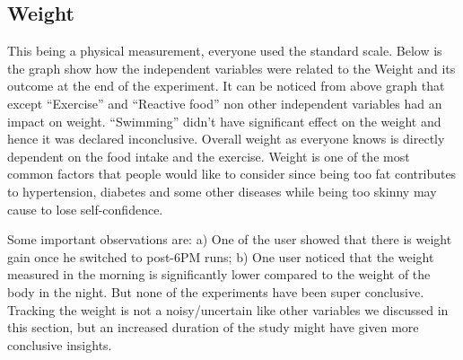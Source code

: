 \subsection{Weight}

This being a physical measurement, everyone used the standard scale. Below is the graph show how the independent variables were related to the Weight and its outcome at the end of the experiment.
It can be noticed from above graph that except “Exercise” and “Reactive food” non other independent variables had an impact on weight. “Swimming” didn’t have significant effect on the weight and hence it was declared inconclusive. Overall weight as everyone knows is directly dependent on the food intake and the exercise. Weight is one of the most common factors that people would like to consider since being too fat contributes to hypertension, diabetes and some other diseases while being too skinny may cause to lose self-confidence. 

Some important observations are: a) One of the user showed that there is weight gain once he switched to post-6PM runs; b) One user noticed that the weight measured in the morning is significantly lower compared to the weight of the body in the night. But none of the experiments have been super conclusive. Tracking the weight is not a noisy/uncertain like other variables we discussed in this section, but an increased duration of the study might have given more conclusive insights.

